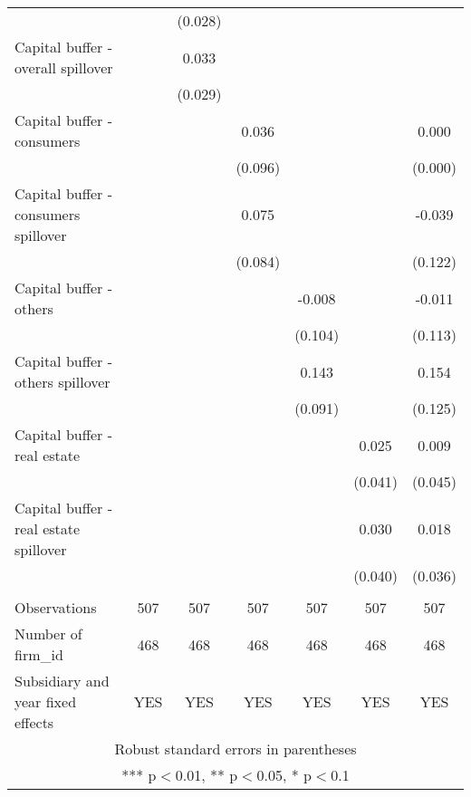 \begin{tabular}{lcccccc}
 &  & (0.028) &  &  &  &  \\
Capital buffer - overall spillover &  & 0.033 &  &  &  &  \\
 &  & (0.029) &  &  &  &  \\
Capital buffer - consumers &  &  & 0.036 &  &  & 0.000 \\
 &  &  & (0.096) &  &  & (0.000) \\
Capital buffer - consumers spillover &  &  & 0.075 &  &  & -0.039 \\
 &  &  & (0.084) &  &  & (0.122) \\
Capital buffer - others &  &  &  & -0.008 &  & -0.011 \\
 &  &  &  & (0.104) &  & (0.113) \\
Capital buffer - others spillover &  &  &  & 0.143 &  & 0.154 \\
 &  &  &  & (0.091) &  & (0.125) \\
Capital buffer - real estate &  &  &  &  & 0.025 & 0.009 \\
 &  &  &  &  & (0.041) & (0.045) \\
Capital buffer - real estate spillover &  &  &  &  & 0.030 & 0.018 \\
 &  &  &  &  & (0.040) & (0.036) \\
 &  &  &  &  &  &  \\
Observations & 507 & 507 & 507 & 507 & 507 & 507 \\
Number of firm\_id & 468 & 468 & 468 & 468 & 468 & 468 \\
 Subsidiary and year fixed effects & YES & YES & YES & YES & YES & YES \\ \hline
\multicolumn{7}{c}{ Robust standard errors in parentheses} \\
\multicolumn{7}{c}{ *** p$<$0.01, ** p$<$0.05, * p$<$0.1} \\
\end{tabular}
